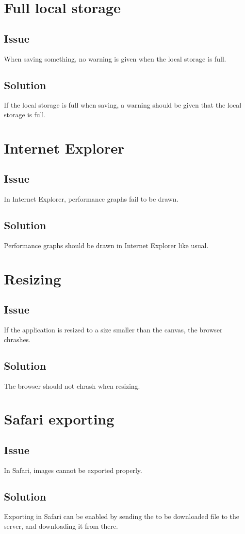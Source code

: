 \section{Full local storage}

\subsection*{Issue}
When saving something, no warning is given when the local storage is full.

\subsection*{Solution}
If the local storage is full when saving, a warning should be given that the local storage is full.

\section{Internet Explorer}

\subsection*{Issue}
In Internet Explorer, performance graphs fail to be drawn.

\subsection*{Solution}
Performance graphs should be drawn in Internet Explorer like usual.\

\section{Resizing}

\subsection*{Issue}
If the application is resized to a size smaller than the canvas, the browser chrashes.

\subsection*{Solution}
The browser should not chrash when resizing.

\section{Safari exporting}

\subsection*{Issue}
In Safari, images cannot be exported properly.

\subsection*{Solution}
Exporting in Safari can be enabled by sending the to be downloaded file to the server, and downloading it from there.